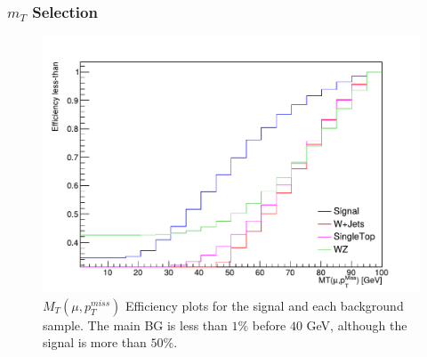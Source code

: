 \documentclass{beamer}
\begin{document}
\begin{frame}
\frametitle{$m_T$ Selection}
\begin{figure}[!h]
	
	\centering
	\includegraphics[scale=0.45]{pictures/Selection/m_T/Eff-m_T}
	\caption{{\scriptsize $M_T(\mu,p^{miss}_T)$ Efficiency plots for the signal and each background sample. The main BG is less than $1\%$ before $40$ GeV, although the signal is more than $50\%$.}}
	\label{Eff-m_T}
	
\end{figure}


\end{frame}

\end{document}
